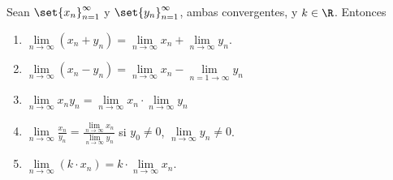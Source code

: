 \begin{proposition}
	Sean \(\set{x_n}^{\infty}_{n = 1 } \) y \(\set{y_n}^{\infty}_{n = 1} \), ambas convergentes, y \(k \in \R \). Entonces
	\begin{enumerate}
		\item \(\lim\limits_{n \to \infty} (x_n + y_n) = \lim\limits_{n \to \infty} x_n + \lim\limits_{n \to \infty} y_n\).
		\item  \(\lim\limits_{n \to \infty} (x_n - y_n) = \lim\limits_{n \to \infty} x_n - \lim\limits_{n = 1 \to \infty} y_n \)
		\item \(\lim\limits_{n \to \infty} x_n y_n = \lim\limits_{n \to \infty} x_n \cdot \lim\limits_{n \to \infty} y_n \)
		\item \(\lim\limits_{n \to \infty} \frac{x_n }{y_n } = \frac{\lim\limits_{n \to \infty} x_n }{\lim\limits_{n \to \infty} y_n}\) si \(y_0 \neq 0 \), \(\lim\limits_{n \to \infty} y_n \neq 0 \).
		\item \(\lim\limits_{n \to \infty} (k \cdot x_n) = k \cdot \lim\limits_{n \to \infty} x_n \).
	\end{enumerate}
\end{proposition}
